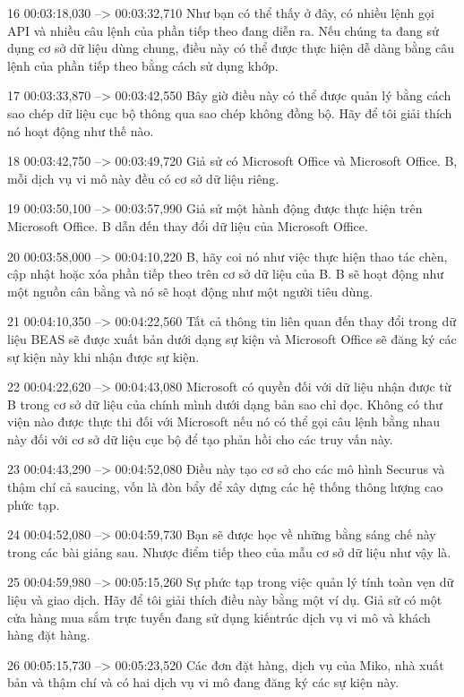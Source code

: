 16
00:03:18,030 --> 00:03:32,710
Như bạn có thể thấy ở đây, có nhiều lệnh gọi API và nhiều câu lệnh của phần tiếp theo đang diễn ra.  Nếu chúng ta đang sử dụng cơ sở dữ liệu dùng chung, điều này có thể được thực hiện dễ dàng bằng câu lệnh của phần tiếp theo bằng cách sử dụng khớp.

17
00:03:33,870 --> 00:03:42,550
Bây giờ điều này có thể được quản lý bằng cách sao chép dữ liệu cục bộ thông qua sao chép không đồng bộ.  Hãy để tôi giải thích nó hoạt động như thế nào.

18
00:03:42,750 --> 00:03:49,720
Giả sử có Microsoft Office và Microsoft Office.  B, mỗi dịch vụ vi mô này đều có cơ sở dữ liệu riêng.

19
00:03:50,100 --> 00:03:57,990
Giả sử một hành động được thực hiện trên Microsoft Office.  B dẫn đến thay đổi dữ liệu của Microsoft Office.

20
00:03:58,000 --> 00:04:10,220
B, hãy coi nó như việc thực hiện thao tác chèn, cập nhật hoặc xóa phần tiếp theo trên cơ sở dữ liệu của B.  B sẽ hoạt động như một nguồn cân bằng và nó sẽ hoạt động như một người tiêu dùng.

21
00:04:10,350 --> 00:04:22,560
Tất cả thông tin liên quan đến thay đổi trong dữ liệu BEAS sẽ được xuất bản dưới dạng sự kiện và Microsoft Office sẽ đăng ký các sự kiện này khi nhận được sự kiện.

22
00:04:22,620 --> 00:04:43,080
Microsoft có quyền đối với dữ liệu nhận được từ B trong cơ sở dữ liệu của chính mình dưới dạng bản sao chỉ đọc.  Không có thư viện nào được thực thi đối với Microsoft nếu nó có thể gọi câu lệnh bằng nhau này đối với cơ sở dữ liệu cục bộ để tạo phản hồi cho các truy vấn này.

23
00:04:43,290 --> 00:04:52,080
Điều này tạo cơ sở cho các mô hình Securus và thậm chí cả saucing, vốn là đòn bẩy để xây dựng các hệ thống thông lượng cao phức tạp.

24
00:04:52,080 --> 00:04:59,730
Bạn sẽ được học về những bằng sáng chế này trong các bài giảng sau.  Nhược điểm tiếp theo của mẫu cơ sở dữ liệu như vậy là.

25
00:04:59,980 --> 00:05:15,260
Sự phức tạp trong việc quản lý tính toàn vẹn dữ liệu và giao dịch.  Hãy để tôi giải thích điều này bằng một ví dụ.  Giả sử có một cửa hàng mua sắm trực tuyến đang sử dụng kiến ​​trúc dịch vụ vi mô và khách hàng đặt hàng.

26
00:05:15,730 --> 00:05:23,520
Các đơn đặt hàng, dịch vụ của Miko, nhà xuất bản và thậm chí và có hai dịch vụ vi mô đang đăng ký các sự kiện này.

